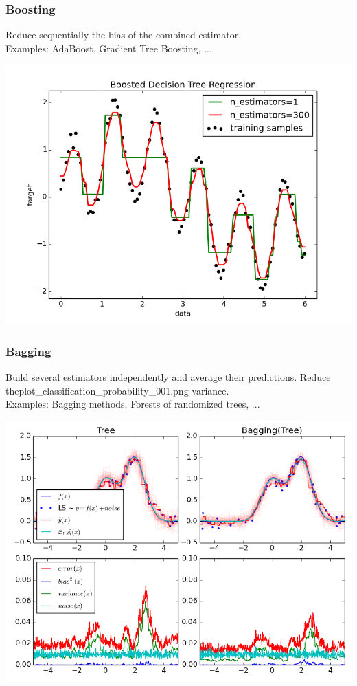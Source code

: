 \begin{frame}
\frametitle{Boosting}

Reduce sequentially the bias of the combined
estimator. \\

Examples: AdaBoost, Gradient Tree Boosting, ...\\

\begin{center}
\includegraphics[width=.75\linewidth]{sklearn_material/plot_adaboost_regression.png}
\end{center}

\end{frame}


\begin{frame}
\frametitle{Bagging}

Build several estimators independently and average their
predictions. Reduce theplot_classification_probability_001.png variance.\\

Examples: Bagging methods, Forests of randomized trees, ...\\

\begin{center}
\includegraphics[width=.7\linewidth]{sklearn_material/bias_variance.png}
\end{center}

\end{frame}



